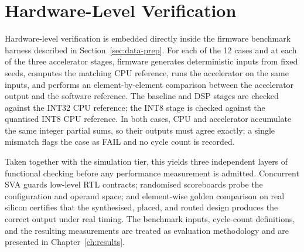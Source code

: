 \section{Hardware-Level Verification}

Hardware-level verification is embedded directly inside the firmware
benchmark harness described in Section~\ref{sec:data-prep}. For each
of the 12 cases and at each of the three accelerator stages, firmware
generates deterministic inputs from fixed seeds, computes the matching
CPU reference, runs the accelerator on the same inputs, and performs an
element-by-element comparison between the accelerator output and the
software reference. The baseline and DSP stages are checked against the
INT32 CPU reference; the INT8 stage is checked against the quantised
INT8 CPU reference. In both cases, CPU and accelerator accumulate the
same integer partial sums, so their outputs must agree exactly; a
single mismatch flags the case as FAIL and no cycle count is recorded.

Taken together with the simulation tier, this yields three independent
layers of functional checking before any performance measurement is
admitted. Concurrent SVA guards low-level RTL contracts; randomised
scoreboards probe the configuration and operand space; and element-wise
golden comparison on real silicon certifies that the synthesised,
placed, and routed design produces the correct output under real
timing. The benchmark inputs, cycle-count definitions, and the
resulting measurements are treated as evaluation methodology and are
presented in Chapter~\ref{ch:results}.
